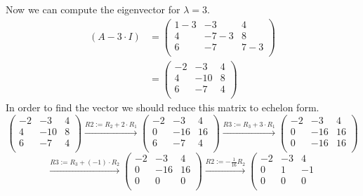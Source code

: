 \documentclass[a4paper]{article}
\begin{document}
\begin{enumerate}
  Now we can compute the eigenvector for $\lambda = 3$.
  \begin{align*}
    (A - 3 \cdot I) &=
    \left(
    \begin{array}{rrr}
    1 - 3 & -3 & 4 \\
    4 & -7 - 3 & 8 \\
    6 & -7 & 7 - 3 \\
    \end{array}
    \right) \\
    &=
    \left(
    \begin{array}{rrr}
    -2 & -3 & 4 \\
    4 & -10 & 8 \\
    6 & -7 & 4 \\
    \end{array}
    \right)
  \end{align*}
  In order to find the vector we should reduce this matrix to echelon form.
  \[
  \left(
  \begin{array}{rrr}
  -2 & -3 & 4 \\
  4 & -10 & 8 \\
  6 & -7 & 4 \\
  \end{array}
  \right)
  \xrightarrow{R2 := R_2 + 2 \cdot R_1}
  \left(
  \begin{array}{rrr}
  -2 & -3 & 4 \\
  0 & -16 & 16 \\
  6 & -7 & 4 \\
  \end{array}
  \right)
  \xrightarrow{R3 := R_3 + 3 \cdot R_1}
  \left(
  \begin{array}{rrr}
  -2 & -3 & 4 \\
  0 & -16 & 16 \\
  0 & -16 & 16 \\
  \end{array}
  \right)
  \]
  \[
  \xrightarrow{R3 := R_3 + (-1) \cdot R_2}
  \left(
  \begin{array}{rrr}
  -2 & -3 & 4 \\
  0 & -16 & 16 \\
  0 & 0 & 0 \\
  \end{array}
  \right)
  \xrightarrow{R2 := -\frac{1}{16} R_2}
  \left(
  \begin{array}{rrr}
  -2 & -3 & 4 \\
  0 & 1 & -1 \\
  0 & 0 & 0 \\
  \end{array}
\]
\end{enumerate}
\end{document}

